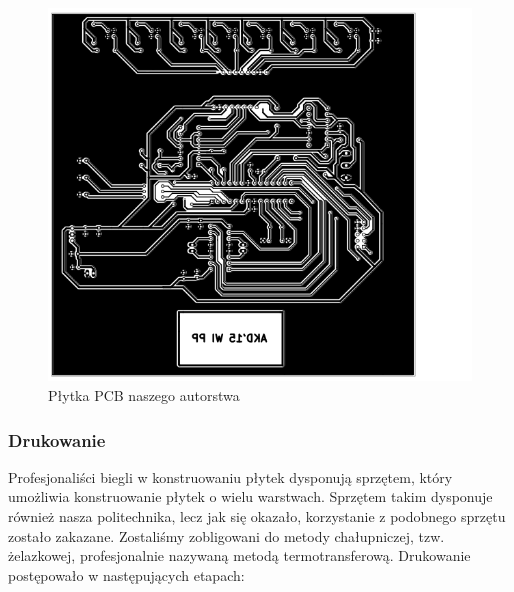 \begin{figure}
\includegraphics[scale=0.8]{board.png}
\caption{Płytka PCB naszego autorstwa}
\end{figure}
\subsubsection{Drukowanie}

Profesjonaliści biegli w konstruowaniu płytek dysponują sprzętem, który umożliwia konstruowanie płytek o wielu warstwach. Sprzętem takim dysponuje również nasza politechnika, lecz jak się okazało, korzystanie z podobnego sprzętu zostało zakazane. Zostaliśmy zobligowani do metody chałupniczej, tzw. żelazkowej, profesjonalnie nazywaną metodą termotransferową. Drukowanie postępowało w następujących etapach: 

